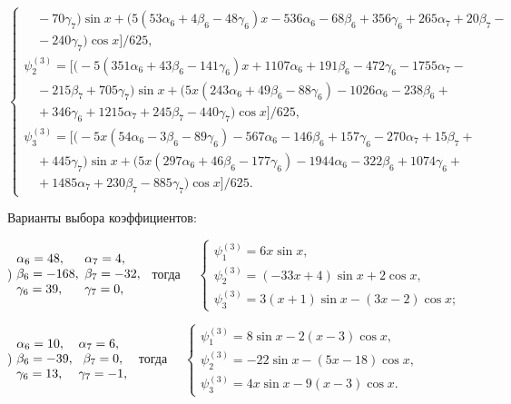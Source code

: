 \documentclass[11pt]{article}
\begin{document}
{\begin{equation*}
\begin{cases}
\quad - 70\gamma_7 \Big) \sin x + \Big( 5(53\alpha_6 + 4\beta_6 - 48\gamma_6)x - 536\alpha_6 - 68\beta_6 + 356\gamma_6 + 265\alpha_7 + 20\beta_7 -  \\
\quad - 240\gamma_7 \Big) \cos x \Big]/625, \\
\psi_2^{(3)} = \Big[ \Big(- 5(351\alpha_6 + 43\beta_6 - 141\gamma_6)x + 1107\alpha_6 + 191\beta_6 - 472\gamma_6 - 1755\alpha_7 - \\ 
\quad - 215\beta_7 + 705\gamma_7 \Big) \sin x + \Big(5x(243\alpha_6 + 49\beta_6 - 88\gamma_6) - 1026\alpha_6 - 238\beta_6 + \\ 
\quad + 346\gamma_6 + 1215\alpha_7 + 245\beta_7 - 440\gamma_7 \Big) \cos x \Big]/625, \\
\psi_3^{(3)} = \Big[ \Big(- 5x(54\alpha_6 - 3\beta_6 - 89\gamma_6) -567\alpha_6 - 146\beta_6 + 157\gamma_6 - 270\alpha_7 + 15\beta_7 + \\
\quad + 445\gamma_7 \Big) \sin x + \Big(5x(297\alpha_6 + 46\beta_6 - 177\gamma_6) - 1944\alpha_6 - 322\beta_6 + 1074\gamma_6 + \\ 
\quad + 1485\alpha_7 + 230\beta_7 - 885\gamma_7 \Big) \cos x \Big]/625.
\end{cases}
\end{equation*}

\smallskip
Варианты выбора коэффициентов: 

) $\begin{matrix} \alpha_6 = 48,\hfill\\ \beta_6 = -168,\\ \gamma_6 = 39,\hfill \end{matrix}$
$\begin{matrix} \alpha_7 = 4,\hfill\\ \beta_7 = -32,\\ \gamma_7 = 0,\hfill \end{matrix}$ \ 
тогда \ \ $\begin{cases} 
\psi_1^{(3)} = 6x\sin x, \\
\psi_2^{(3)} = (-33x+4) \sin x + 2\cos x, \\
\psi_3^{(3)} = 3(x+1) \sin x - (3x-2) \cos x;
\end{cases}$

) $\begin{matrix} \alpha_6 = 10,\hfill\\ \beta_6 = -39,\\ \gamma_6 = 13,\hfill \end{matrix}$
$\begin{matrix} \alpha_7 = 6,\hfill\\ \beta_7 = 0,\\ \gamma_7 = -1,\hfill \end{matrix}$ \ 
тогда \ \ $\begin{cases} 
\psi_1^{(3)} = 8\sin x - 2(x-3)\cos x, \\
\psi_2^{(3)} = -22\sin x - (5x-18) \cos x, \\
\psi_3^{(3)} = 4x \sin x - 9(x - 3)\cos x.
\end{cases}$

}
\end{document}
